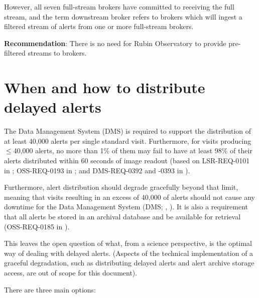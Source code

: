 \documentclass[DM,authoryear,toc]{lsstdoc}
\begin{document}
However, all seven full-stream brokers have committed to receiving the full stream, and the term downstream broker refers to 
brokers which will ingest a filtered stream of alerts from one or more full-stream brokers.

\textbf{Recommendation}: There is no need for Rubin Observatory to provide pre-filtered streams to brokers.


\section{When and how to distribute delayed alerts}\label{sec:delayed}

The Data Management System (DMS) is required to support the distribution of at least 40,000 alerts per single standard visit.
Furthermore, for visits producing $\leq$40,000 alerts, no more than 1\% of them may fail to have at least 98\% of their alerts distributed 
within 60 seconds of image readout (based on LSR-REQ-0101 in ; OSS-REQ-0193 in ; 
and DMS-REQ-0392 and -0393 in ).

Furthermore, alert distribution should degrade gracefully beyond that limit, meaning that visits resulting in an excess of 
40,000 of alerts should not cause any downtime for the Data Management System (DMS; , ).
It is also a requirement that all alerts be stored in an archival database and be available for retrieval 
(OSS-REQ-0185 in ).

This leaves the open question of what, from a science perspective, is the optimal way of dealing with delayed alerts.
(Aspects of the technical implementation of a graceful degradation, such as distributing delayed alerts and alert archive 
storage access, are out of scope for this document).

There are three main options:
\end{document}
